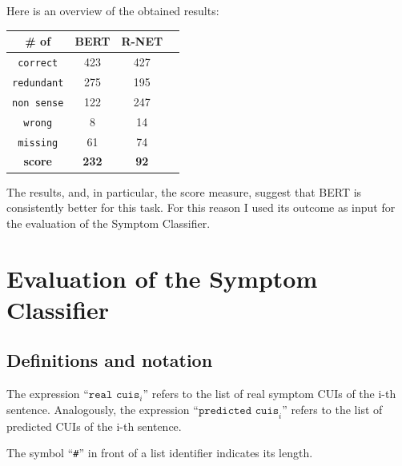 Here is an overview of the obtained results:


\begin{center}
 \begin{tabular}{| c | c | c | c |} 
 \hline
 \# of & BERT & R-NET \\ [0.5ex] 
 \hline\hline
 \rowcolor{green}
 \texttt{correct} & 423 & 427 \\ 
 \hline
 \rowcolor{lightgreen}
 \texttt{redundant} & 275 & 195 \\
 \hline
 \rowcolor{red}
 \texttt{non sense} & 122 & 247 \\
 \hline
 \rowcolor{red}
 \texttt{wrong} & 8 & 14 \\
 \hline
 \rowcolor{red}
 \texttt{missing} & 61 & 74 \\
 \hline
 \textbf{score} & \textbf{232} & \textbf{92} \\ 
 \hline
\end{tabular}
\end{center}

The results, and, in particular, the score measure, suggest that BERT is consistently better for this task. For this reason I used its outcome as input for the evaluation of the Symptom Classifier.

\section{Evaluation of the Symptom Classifier}
\subsection{Definitions and notation}

The expression ``$\texttt{real cuis}_{i}$'' refers to the list of real symptom CUIs of the i-th sentence. Analogously, the expression ``$\texttt{predicted cuis}_{i}$'' refers to the list of predicted CUIs of the i-th sentence.

The symbol ``\texttt{\#}'' in front of a list identifier indicates its length.

